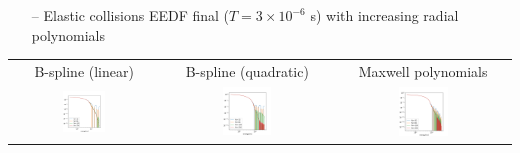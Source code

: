 \documentclass[landscape,archE,fontscale=0.285]{baposter} %
\begin{document}
\begin{poster}
{  \begin{itemize}
    \item [--] Elastic collisions EEDF final ($T=3\times 10^{-6}$ s) with increasing radial polynomials
  \end{itemize}
  \begin{tabular}{ccc}
    B-spline (linear) & B-spline (quadratic)  & Maxwell polynomials \\
    \includegraphics[width=0.3\textwidth]{img/g0_bspline_linear_eedf.png} &
    \includegraphics[width=0.3\textwidth]{img/g0_bspline_quad_eedf.png} &
    \includegraphics[width=0.3\textwidth]{img/g0_maxwell_eedf.png} \\
  \end{tabular}

}
\end{poster}
\end{document}
